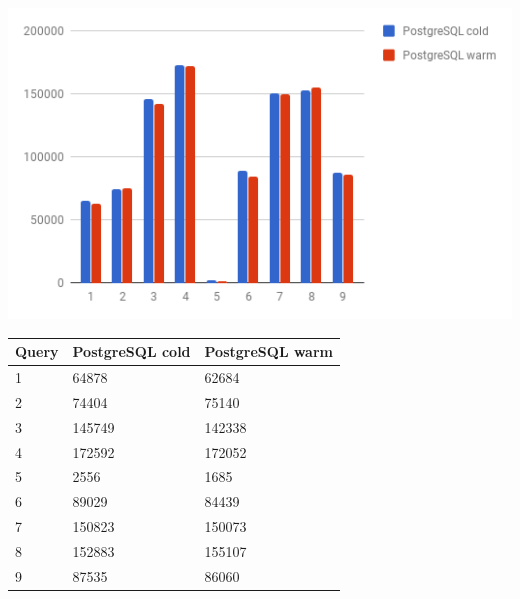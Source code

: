  \begin{minipage}{\textwidth}
  \begin{minipage}[b]{0.6\textwidth}
    \centering
     \includegraphics[width=1.0\textwidth,height=1.0\textheight,keepaspectratio]{images/postgres_cold_vs_warm.png}
    \label{fig:postgres_cold_vs_warm}
  \end{minipage}
  \hfill
  \begin{minipage}[b]{0.4\textwidth}
    \centering
  \begin{tabular}{ |l|p{2cm}|p{2cm}| }
    \hline
    Query & PostgreSQL cold & PostgreSQL warm \\
    \hline
    1 & 64878 & 62684 \\
    2 & 74404 & 75140 \\
    3 & 145749 & 142338 \\
    4 & 172592 & 172052 \\
    5 & 2556 & 1685 \\
    6 & 89029 & 84439 \\
    7 & 150823 & 150073 \\
    8 & 152883 & 155107 \\
    9 & 87535 & 86060 \\
    \hline
\end{tabular}
            \label{tab:postgres_cold_vs_warm}
    \end{minipage}
 \end{minipage}




